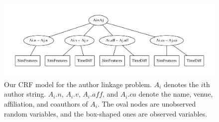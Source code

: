 \documentclass[twocolumn,letterpaper]{article}
\begin{document}
\begin{figure}
\centering
\includegraphics[width=\textwidth]{crf}
\caption{Our CRF model for the author linkage problem.  $A_i$ denotes
  the $i$th author string.  $A_i.n$, $A_i.v$, $A_i.aff$, and $A_i.ca$
  denote the name, venue, affiliation, and coauthors of $A_i$.  The
  oval nodes are unobserved random variables, and the box-shaped ones
  are observed variables.}
\label{fig:crf}
\end{figure}
\end{document}
